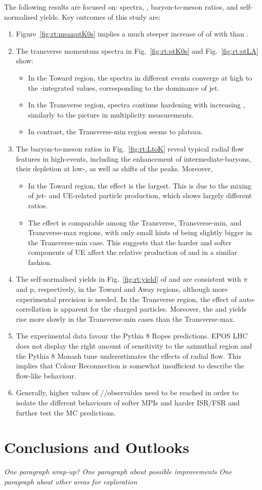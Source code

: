 The following results are focused on: \pt spectra, \meanpt, baryon-to-meson ratios, and self-normalised yields. Key outcomes of this study are:
\begin{enumerate}
\item Figure~\ref{fig:rt:meanptK0s} implies a much steeper increase of \meanpt of \KOs with \RTmax than \RTmin.
\item The transverse momentum spectra in Fig.~\ref{fig:rt:ptK0s} and Fig.~\ref{fig:rt:ptLA} show:
\begin{itemize}
\item In the Toward region, the spectra in different \RT events converge at high \pt to the \RT-integrated values, corresponding to the dominance of jet.
\item In the Transverse region, \pt spectra continue hardening with increasing \RT, similarly to the picture in multiplicity measurements.
\item In contrast, the Transverse-min region seems to plateau.
\end{itemize}
\item The baryon-to-meson ratios in Fig.~\ref{fig:rt:LtoK} reveal typical radial flow features in high-\RT events, including the enhancement of intermediate-\pt baryons, their depletion at low-\pt, as well as shifts of the peaks. Moreover,
\begin{itemize}
\item In the Toward region, the effect is the largest. This is due to the mixing of jet- and UE-related particle production, which shows largely different \ltok ratios.
\item The effect is comparable among the Transverse, Transverse-min, and Transverse-max regions, with only small hints of being slightly bigger in the Transverse-min case. This suggests that the harder and softer components of UE affect the relative production of \LA and \KOs in a similar fashion.
\end{itemize}
\item The self-normalised yields in Fig.~\ref{fig:rt:yield} of \KOs and \LA are consistent with $\pi$ and p, respectively, in the Toward and Away regions, although more experimental precision is needed. In the Transverse region, the effect of auto-correllation is apparent for the charged particles. Moreover, the \KOs and \LA yields rise more slowly in the Transverse-min cases than the Transverse-max.
\item The experimental data favour the Pythia 8 Ropes predictions. EPOS LHC does not display the right amount of sensitivity to the azimuthal region and the Pythia 8 Monash tune underestimates the effects of radial flow. This implies that Colour Reconnection is somewhat insufficient to describe the flow-like behaviour.
\item Generally, higher values of \RT/\RTmin/\RTmax observables need to be reached in order to isolate the different behaviours of softer MPIs and harder ISR/FSR and further test the MC predictions.
\end{enumerate}

\section{Conclusions and Outlooks}

\textit{One paragraph wrap-up?}
\textit{One paragraph about possible improvements}
\textit{One paragraph about other areas for exploration}